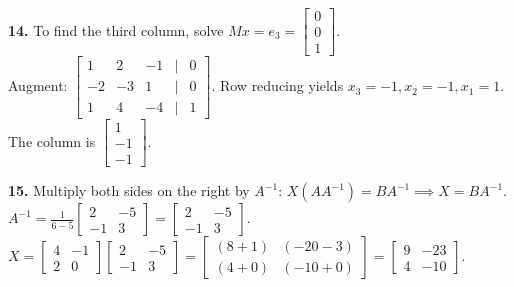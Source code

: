 \documentclass{article}
\begin{document}
\vspace{5pt}
\noindent
\textbf{14.} To find the third column, solve $Mx = e_3 = \begin{bmatrix} 0 \\ 0 \\ 1 \end{bmatrix}$. \\
Augment: $\begin{bmatrix} 1 & 2 & -1 & \mid & 0 \\ -2 & -3 & 1 & \mid & 0 \\ 1 & 4 & -4 & \mid & 1 \end{bmatrix}$. Row reducing yields $x_3 = -1, x_2 = -1, x_1 = 1$. The column is $\begin{bmatrix} 1 \\ -1 \\ -1 \end{bmatrix}$.

\vspace{5pt}
\noindent
\textbf{15.} Multiply both sides on the right by $A^{-1}$: $X(AA^{-1}) = BA^{-1} \implies X = BA^{-1}$. \\
$A^{-1} = \frac{1}{6-5} \begin{bmatrix} 2 & -5 \\ -1 & 3 \end{bmatrix} = \begin{bmatrix} 2 & -5 \\ -1 & 3 \end{bmatrix}$. \\
$X = \begin{bmatrix} 4 & -1 \\ 2 & 0 \end{bmatrix} \begin{bmatrix} 2 & -5 \\ -1 & 3 \end{bmatrix} = \begin{bmatrix} (8+1) & (-20-3) \\ (4+0) & (-10+0) \end{bmatrix} = \begin{bmatrix} 9 & -23 \\ 4 & -10 \end{bmatrix}$.
\end{document}
